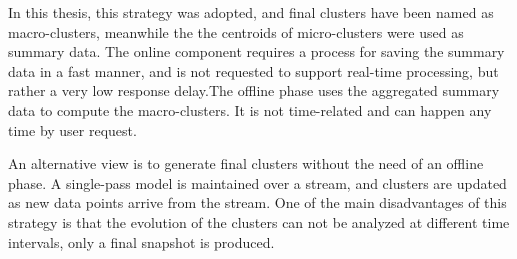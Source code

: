 In this thesis, this strategy was adopted, and final clusters have been named as macro-clusters, meanwhile the the centroids of micro-clusters were used as summary data. The online component requires a process for saving the summary data in a fast manner, and is not requested to support real-time processing, but rather a very low response delay.The offline phase uses the aggregated summary data to compute the macro-clusters. It is not time-related and can happen any time by user request.




An alternative view is to generate final clusters without the need of an offline phase. A single-pass model is maintained over a stream, and clusters are updated as new data points arrive from the stream. One of the main disadvantages of this strategy is that the evolution of the clusters can not be analyzed at different time intervals, only a final snapshot is produced.     





    







